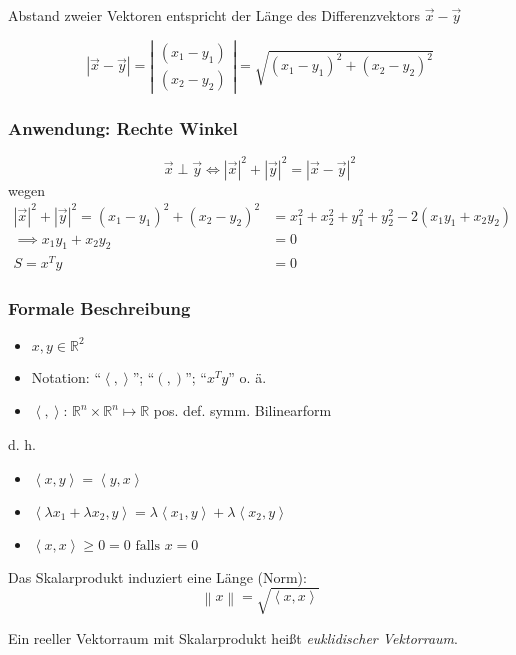 \begin{note}
Abstand zweier Vektoren entspricht der Länge des Differenzvektors $\vec{x} - \vec{y}$
\end{note}

\begin{equation*}
	|\vec{x} - \vec{y}| = \left|
 	\begin{array}{cc}
		(x_1 - y_1)\\
		(x_2 - y_2)
 	\end{array}\right| = 
 	\sqrt{(x_1 - y_1)^2 + (x_2 - y_2)^2}
\end{equation*}

\subsubsection*{Anwendung: Rechte Winkel}

\begin{theorem}
\begin{equation*}
	\vec{x} \perp \vec{y} \Leftrightarrow |\vec{x}|^2 + |\vec{y}|^2 = |\vec{x} - \vec{y}|^2
\end{equation*}
wegen
\begin{align*}
	|\vec{x}|^2 + |\vec{y}|^2 = (x_1 - y_1)^2 + (x_2 - y_2)^2 &= x_1^2 + x_2^2 + y_1^2 + y_2^2 - 2(x_1 y_1 + x_2 y_2) \\
	\implies x_1 y_1 + x_2 y_2 &= 0 \\
	S = x^T y &= 0
\end{align*}
\end{theorem}

\subsubsection*{Formale Beschreibung}
\begin{definition}[Skalarprodukt]\flush
	\begin{itemize}
		\item $ x, y \in \mathbb{R}^2 $
		\item Notation: "`$ \left<, \right>$"'; "`$(, )$"'; "`$x^T y$"' o. ä.
		\item $\left<, \right>$: $\mathbb{R}^n \times \mathbb{R}^n \mapsto \mathbb{R}$ pos. def. symm. Bilinearform
	\end{itemize}
\end{definition}

\noindent d. h. \begin{itemize}
	\item $ \left<x, y\right> = \left<y, x\right>$
	\item $ \left<\lambda x_1 + \lambda x_2, y\right> = \lambda \left<x_1, y\right> + \lambda \left<x_2, y\right>$
	\item $ \left<x, x\right> \geq 0 = 0 \text{ falls } x = 0$
\end{itemize}
%
Das Skalarprodukt induziert eine Länge (Norm):
\begin{equation*}
	\left\| x \right\| = \sqrt{\left<x, x\right>}
\end{equation*}
%
\begin{definition}
  Ein reeller Vektorraum mit Skalarprodukt heißt \emph{euklidischer Vektorraum}.
\end{definition}


